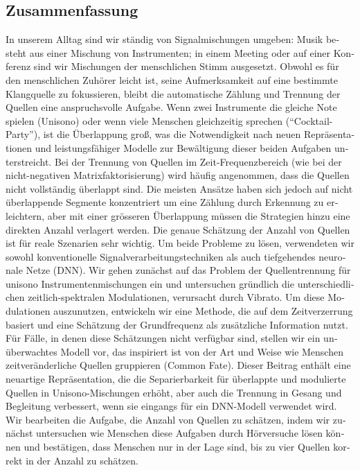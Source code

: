 \begin{otherlanguage}{ngerman}
\chapter*{Zusammenfassung}

In unserem Alltag sind wir ständig von Signalmischungen umgeben: Musik  besteht aus einer Mischung von Instrumenten; in einem Meeting oder auf einer Konferenz sind wir Mischungen der menschlichen Stimm ausgesetzt.
Obwohl es für den menschlichen Zuhörer leicht ist, seine Aufmerksamkeit auf eine bestimmte Klangquelle zu fokussieren, bleibt die automatische Zählung und Trennung der Quellen eine anspruchsvolle Aufgabe.
Wenn zwei Instrumente die gleiche Note spielen (Unisono) oder wenn viele Menschen gleichzeitig sprechen (``Cocktail-Party''), ist die Überlappung groß, was die Notwendigkeit nach neuen Repräsentationen und leistungsfähiger Modelle zur Bewältigung dieser beiden Aufgaben unterstreicht.
Bei der Trennung von Quellen im Zeit-Frequenzbereich (wie bei der nicht-negativen Matrixfaktorisierung) wird häufig angenommen, dass die Quellen nicht vollständig überlappt sind.
Die meisten Ansätze haben sich jedoch auf nicht überlappende Segmente konzentriert um eine Zählung durch Erkennung zu erleichtern, aber mit einer grösseren Überlappung müssen die Strategien hinzu eine direkten  Anzahl verlagert werden.
Die genaue Schätzung der Anzahl von Quellen ist für reale Szenarien sehr wichtig.
Um beide Probleme zu lösen, verwendeten wir sowohl konventionelle Signalverarbeitungstechniken als auch tiefgehendes neuronale Netze (DNN).
Wir gehen zunächst auf das Problem der Quellentrennung für unisono Instrumentenmischungen ein und untersuchen gründlich die unterschiedlichen zeitlich-spektralen Modulationen, verursacht durch Vibrato.
Um diese Modulationen auszunutzen, entwickeln wir eine Methode, die auf dem Zeitverzerrung basiert und eine Schätzung der Grundfrequenz als zusätzliche Information nutzt.
Für Fälle, in denen diese Schätzungen nicht verfügbar sind, stellen wir ein unüberwachtes Modell vor, das inspiriert ist von der Art und Weise  wie Menschen zeitveränderliche Quellen gruppieren (Common Fate).
Dieser Beitrag enthält eine neuartige Repräsentation, die die Separierbarkeit für überlappte und modulierte Quellen in  Unisono-Mischungen erhöht, aber auch die Trennung in Gesang und Begleitung verbessert, wenn sie eingangs für ein DNN-Modell verwendet wird.
Wir bearbeiten die Aufgabe, die Anzahl von Quellen zu schätzen, indem wir zunächst untersuchen wie Menschen diese Aufgaben durch Hörversuche lösen können und bestätigen, dass Menschen nur in der Lage sind, bis zu vier Quellen korrekt in der Anzahl zu schätzen.

\end{otherlanguage}
